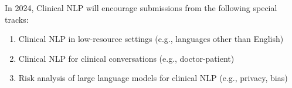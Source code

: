 \begin{wsschedulenolist}
In 2024, Clinical NLP will encourage submissions from the following special tracks:
\begin{enumerate}
\item Clinical NLP in low-resource settings (e.g., languages other than English)
\item Clinical NLP for clinical conversations (e.g., doctor-patient)
\item Risk analysis of large language models for clinical NLP (e.g., privacy, bias)
\end{enumerate}


\end{wsschedulenolist}
